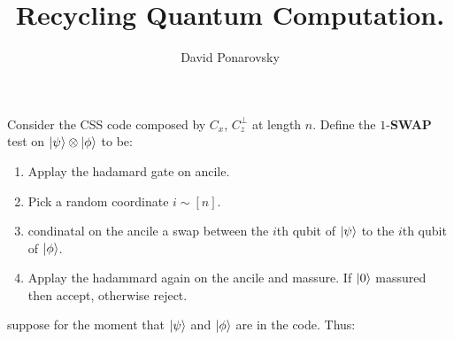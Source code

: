 \documentclass[manuscript,screen,review]{acmart}
\begin{document}


\title{Recycling Quantum Computation.} 
\author{David Ponarovsky}

\ifdefined\ACM
\else
  \maketitle
\fi
%
\ifdefined\ACM
  \maketitle
\fi

% 
%

Consider the CSS code composed by $C_{x}$,  $C^{\perp}_{z}$ at length $n$. Define the $1$-\textbf{SWAP} test on $\ket{\psi}\otimes \ket{\phi}$ to be: 
\begin{enumerate}
  \item Applay the hadamard gate on ancile. 
  \item Pick a random coordinate $i \sim [n]$.
  \item condinatal on the ancile a swap between the $i$th qubit of $\ket{\psi}$ to the $i$th qubit of $\ket{\phi}$. 
  \item Applay the hadammard again on the ancile and massure. If $\ket{0}$ massured then accept, otherwise reject. 
\end{enumerate}

suppose for the moment that $\ket{\psi}$ and $\ket{\phi}$ are in the code. Thus: 
\end{document}
